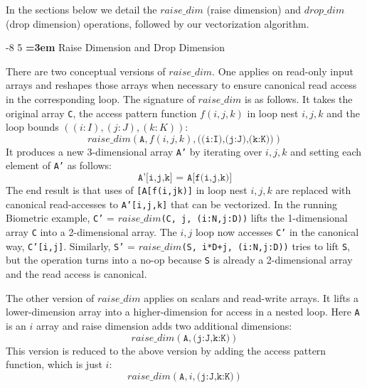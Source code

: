 \documentclass[sigconf, screen, natbib=false, dvipsnames, table]{acmart}
\makeatletter
\renewcommand{\subsection}{\@startsection{subsection}{2}{\z@}%
                        {-8\p@ \@plus -4\p@ \@minus -4\p@}%
                        {5\p@ \@plus 2\p@ \@minus 2\p@}%
                        {\normalfont\Large\bfseries\boldmath
                         \rightskip=\z@ \@plus 3em\pretolerance=10000 }}
\theoremstyle{definition}
\makeatother
\begin{document}
In the sections below we detail the $\mathit{raise\_dim}$ (raise dimension) and $\mathit{drop\_dim}$ (drop dimension) operations,
followed by our vectorization algorithm.



\subsection{Raise Dimension and Drop Dimension}

There are two conceptual versions of $\mathit{raise\_dim}$. One applies on read-only input arrays and reshapes those arrays 
when necessary to ensure canonical read access in the corresponding loop. The signature of $\mathit{raise\_dim}$
is as follows. It takes the original array \texttt{C}, the access pattern function $f(i,j,k)$ in loop nest $i,j,k$ and the loop bounds
$((i:I),(j:J),(k:K))$: 
\[ \mathit{raise\_dim}(\texttt{A}, f(i,j,k), \texttt{((i:I),(j:J),(k:K))}) \]
It produces a new 3-dimensional array \texttt{A'} by iterating over $i,j,k$ and setting each element of  \texttt{A'} as follows:
\[ \texttt{A'[i,j,k] =  A[f(i,j,k)]} \]
The end result is that uses of \texttt{[A[f(i,jk)]} in loop nest $i,j,k$ are replaced with canonical read-accesses to \texttt{A'[i,j,k]}
that can be vectorized. In the running Biometric example, \texttt{C'} = $\mathit{raise\_dim}$\texttt{(C, j, (i:N,j:D))} lifts the 
1-dimensional array \texttt{C} into a 2-dimensional array. The $i,j$ loop now accesses \texttt{C'} in the canonical way, \texttt{C'[i,j]}. 
Similarly, \texttt{S'} = $\mathit{raise\_dim}$\texttt{(S, i*D+j, (i:N,j:D))} tries to lift \texttt{S}, but the operation turns into a no-op 
because \texttt{S} is already a 2-dimensional array and the read access is canonical. 

The other version of $\mathit{raise\_dim}$ applies on scalars and read-write arrays. It lifts a lower-dimension array into a 
higher-dimension for access in a nested loop. Here \texttt{A} is an $i$ array and raise dimension adds two additional dimensions:
\[ \mathit{raise\_dim}(\texttt{A}, \texttt{(j:J,k:K)}) \]
This version is reduced to the above version by adding the access pattern function, which is just $i$: 
\[ \mathit{raise\_dim}(\texttt{A}, i, \texttt{(j:J,k:K)}) \]
\end{document}
